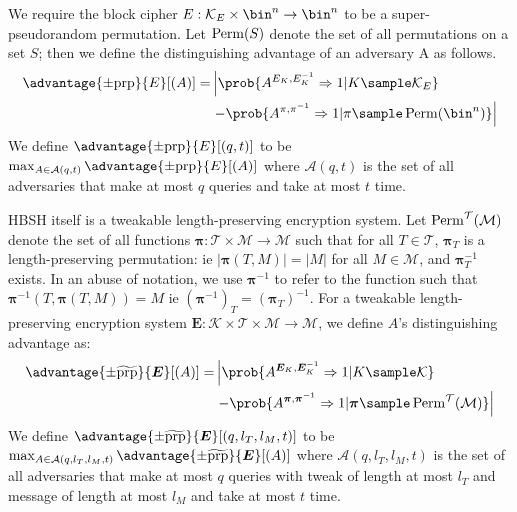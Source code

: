 \documentclass[eprint.tex]{subfiles}
\begin{document}
We require the block cipher
$E: \mathcal{K}_E \times \bin^n \rightarrow \bin^n$
to be a super-pseudorandom permutation.
Let $\operatorname{Perm}(S)$ denote the set of all permutations on a set $S$; then we define the distinguishing
advantage of an adversary A as follows.
%
\begin{displaymath}
    \begin{aligned}
        \advantage{\pm \mathrm{prp}}{E}[(A)] =
        &\left|\prob{A^{E_K,E_K^{-1}}\Rightarrow 1 | K \sample \mathcal{K}_E}\right.
        \\
        &\left. - \prob{A^{\pi,\pi^{-1}}\Rightarrow 1
            | \pi \sample \Perm(\bin^n)}\right|
    \end{aligned}
\end{displaymath}
%
We define $\advantage{\pm \mathrm{prp}}{E}[(q, t)]$ to be
$\max_{A \in \mathcal{A}(q, t)} \advantage{\pm \mathrm{prp}}{E}[(A)]$ where $\mathcal{A}(q, t)$
is the set of all adversaries that make at most $q$ queries and take at most $t$ time.

HBSH itself is a tweakable length-preserving encryption system.
Let $\operatorname{Perm}^\mathcal{T}(\mathcal{M})$ denote the set of all functions
$\bm{\pi} : \mathcal{T} \times \mathcal{M} \rightarrow \mathcal{M}$
such that for all $T \in \mathcal{T}$,
$\bm{\pi}_{T}$ is a length-preserving permutation: ie
$|\bm{\pi}(T, M)| = |M|$ for all $M \in \mathcal{M}$,
and $\bm{\pi}_{T}^{-1}$ exists.
In an abuse of notation, we use $\bm{\pi}^{-1}$ to refer to the function
such that $\bm{\pi}^{-1}(T, \bm{\pi}(T, M)) = M$ ie $(\bm{\pi}^{-1})_T = (\bm{\pi}_T)^{-1}$.
For a tweakable length-preserving encryption system
$\bm{E} : \mathcal{K} \times \mathcal{T} \times \mathcal{M} \rightarrow \mathcal{M}$, we
define $A$'s distinguishing advantage as:
%
\begin{displaymath}
    \begin{aligned}
        \advantage{\pm \widetilde{\mathrm{prp}}}{\bm{E}}[(A)] =
        &\left|\prob{A^{\bm{E}_K,\bm{E}_K^{-1}}\Rightarrow 1 | K \sample \mathcal{K}}\right.
        \\
        &\left. - \prob{A^{\bm{\pi},\bm{\pi}^{-1}}\Rightarrow 1
            | \bm{\pi} \sample \Perm^\mathcal{T}(\mathcal{M})}\right|
    \end{aligned}
\end{displaymath}
%
We define $\advantage{\pm \widetilde{\mathrm{prp}}}{\bm{E}}[(q, l_T, l_M, t)]$
to be
$\max_{A \in \mathcal{A}(q, l_T, l_M, t)} \advantage{\pm \widetilde{\mathrm{prp}}}{\bm{E}}[(A)]$
where $\mathcal{A}(q, l_T, l_M, t)$
is the set of all adversaries that
make at most $q$ queries
with tweak of length at most $l_T$
and message of length at most $l_M$
and take at most $t$ time.
\end{document}
